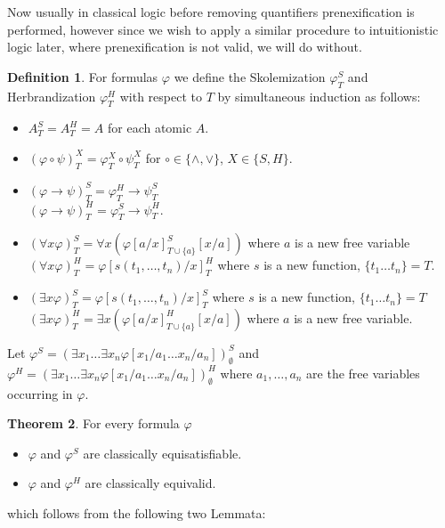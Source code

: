 \documentclass[a4paper,12pt]{report}
\theoremstyle{definition}
\newtheorem{theorem}{Theorem}[section]
\theoremstyle{definition}
\theoremstyle{definition}
\theoremstyle{definition}
\theoremstyle{definition}
\newtheorem{definition}[theorem]{Definition}
\theoremstyle{definition}
\theoremstyle{definition}
\begin{document}
	Now usually in classical logic before removing quantifiers prenexification is performed, however since we wish to apply a similar procedure to intuitionistic logic later, where prenexification is not valid, we will do without.
	
	\begin{definition}
		For formulas $\varphi$ we define the Skolemization $\varphi^S_T$ and Herbrandization $\varphi^H_T$ with respect to $T$ by simultaneous induction as follows:
		\begin{itemize}
			\item $A^S_T = A^H_T = A$ for each atomic $A$.
			\item $(\varphi\circ\psi)^X_T = \varphi^X_T\circ\psi^X_T$ for $\circ\in\{\wedge, \vee\}$, $X\in\{S, H\}$.
			\item $(\varphi\to\psi)^S_T = \varphi^H_T\to \psi^S_T$\\$(\varphi\to\psi)^H_T = \varphi^S_T\to\psi^H_T$.
			\item $(\forall x\varphi)^S_T = \forall x(\varphi[a/x]^S_{T\cup\{a\}}[x/a])$ where $a$ is a new free variable\\$(\forall x\varphi)^H_T = \varphi[s(t_1,\dots,t_n)/x]^H_T$ where $s$ is a new function, $\{t_1\dots t_n\} = T$.
			\item $(\exists x\varphi)^S_T = \varphi[s(t_1,\dots,t_n)/x]^S_T$ where $s$ is a new function, $\{t_1\dots t_n\} = T$\\$(\exists x\varphi)^H_T = \exists x(\varphi[a/x]^H_{T\cup\{a\}}[x/a])$ where $a$ is a new free variable.
		\end{itemize}
		Let $\varphi^S = (\exists x_1\dots\exists x_n \varphi[x_1/a_1\dots x_n/a_n])^S_\emptyset$ and $\varphi^H = (\exists x_1\dots\exists x_n \varphi[x_1/a_1\dots x_n/a_n])^H_\emptyset$ where $a_1,\dots,a_n$ are the free variables occurring in $\varphi$.
	\end{definition}

	\begin{theorem}For every formula $\varphi$
		\begin{itemize}
			\item $\varphi$ and $\varphi^S$ are classically equisatisfiable.
			\item $\varphi$ and $\varphi^H$ are classically equivalid.
		\end{itemize}
	\end{theorem}

	which follows from the following two Lemmata:
	
\end{document}
